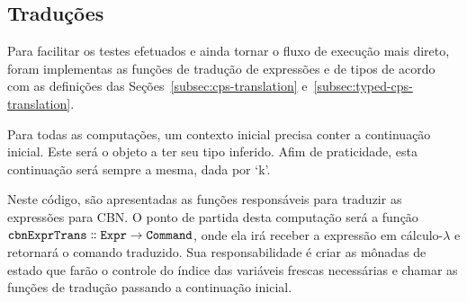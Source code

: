 \subsection{Traduções}\label{subsec:cps-translations}
Para facilitar os testes efetuados e ainda tornar o fluxo de execução mais direto, foram implementas as funções de tradução de expressões e de tipos de acordo com as definições das Seções~\ref{subsec:cps-translation} e~\ref{subsec:typed-cps-translation}.


Para todas as computações, um contexto inicial precisa conter a continuação inicial.
Este será o objeto a ter seu tipo inferido.
Afim de praticidade, esta continuação será sempre a mesma, dada por `k'.


Neste código, são apresentadas as funções responsáveis para traduzir as expressões para CBN.
O ponto de partida desta computação será a função $\mathtt{cbnExprTrans \dblcolon Expr \to Command}$, onde ela irá receber a expressão em cálculo-$\lambda$ e retornará o comando traduzido.
Sua responsabilidade é criar as mônadas de estado que farão o controle do índice das variáveis frescas necessárias e chamar as funções de tradução passando a continuação inicial.


